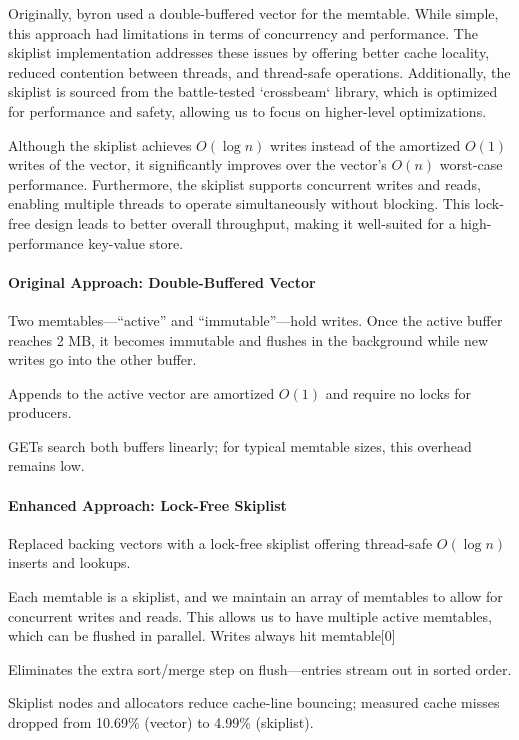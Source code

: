 \documentclass[10pt]{article}
\begin{document}
Originally, byron used a double-buffered vector for the memtable. While simple, this approach had limitations in terms of concurrency and performance. The skiplist implementation addresses these issues by offering better cache locality, reduced contention between threads, and thread-safe operations. Additionally, the skiplist is sourced from the battle-tested `crossbeam` library, which is optimized for performance and safety, allowing us to focus on higher-level optimizations.

Although the skiplist achieves $O(\log n)$ writes instead of the amortized $O(1)$ writes of the vector, it significantly improves over the vector’s $O(n)$ worst-case performance. Furthermore, the skiplist supports concurrent writes and reads, enabling multiple threads to operate simultaneously without blocking. This lock-free design leads to better overall throughput, making it well-suited for a high-performance key-value store.

\paragraph{Original Approach: Double-Buffered Vector}
\begin{description}[leftmargin=1em,labelwidth=*,itemsep=0.25ex]
  \item[Double buffers] Two memtables—“active” and “immutable”—hold writes. Once the active buffer reaches 2 MB, it becomes immutable and flushes in the background while new writes go into the other buffer.
  \item[Lock-free writes] Appends to the active vector are amortized $O(1)$ and require no locks for producers.
  \item[Linear scans for reads] GETs search both buffers linearly; for typical memtable sizes, this overhead remains low.
\end{description}

\paragraph{Enhanced Approach: Lock-Free Skiplist}
\begin{description}[leftmargin=1em,labelwidth=*,itemsep=0.5ex]
  \item[Crossbeam \texttt{SkipMap}] Replaced backing vectors with a lock-free skiplist offering thread-safe $O(\log n)$ inserts and lookups.
  \item[Memtable Array] Each memtable is a skiplist, and we maintain an array of memtables to allow for concurrent writes and reads. This allows us to have multiple active memtables, which can be flushed in parallel. Writes always hit memtable[0]
  \item[Built-in ordering] Eliminates the extra sort/merge step on flush—entries stream out in sorted order.
  \item[Improved cache locality] Skiplist nodes and allocators reduce cache-line bouncing; measured cache misses dropped from 10.69\% (vector) to 4.99\% (skiplist).
\end{description}
\end{document}
